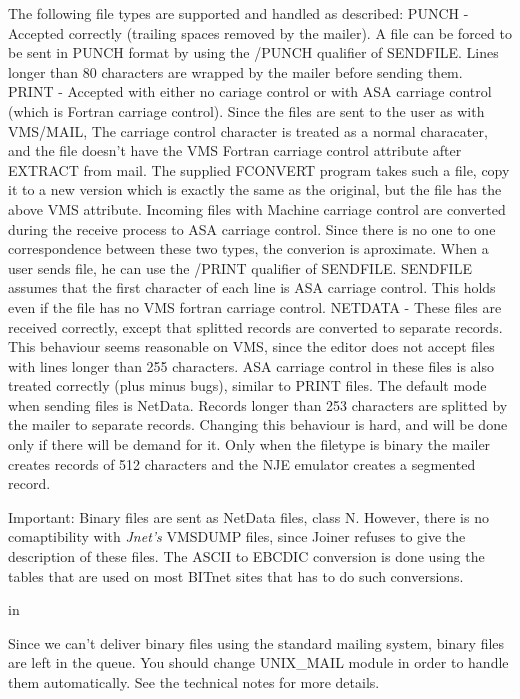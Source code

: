 The following file types are supported and handled as described:
\hfill\break
{\ncrBold PUNCH} -
Accepted  correctly (trailing spaces removed by the mailer). A
file can be forced to be sent  in  PUNCH  format  by  using  the  /PUNCH
qualifier  of  SENDFILE.  Lines longer than 80 characters are wrapped by
the mailer before sending them.
\hfill\break
{\ncrBold PRINT}
- Accepted with either no cariage control  or  with  ASA  carriage
control (which is Fortran carriage control). Since the files are sent to
the user as with VMS/MAIL, The carriage control character is treated  as
a  normal characater, and the file doesn't have the VMS Fortran carriage
control attribute after EXTRACT from mail. The supplied FCONVERT program
takes such a file, copy it to a new version which is exactly the same as
the original, but the file has the above VMS attribute.  Incoming  files
with  Machine  carriage control are converted during the receive process
to ASA carriage control. Since there is no  one  to  one  correspondence
between these two types, the converion is aproximate.
When  a user sends file, he can use the /PRINT qualifier of SENDFILE.
SENDFILE assumes that the first character of each line is  ASA  carriage
control.  This  holds  even  if  the  file  has  no VMS fortran carriage
control.
\hfill\break
{\ncrBold NETDATA}
- These files  are  received  correctly,  except  that  splitted
records   are  converted  to  separate  records.  This  behaviour  seems
reasonable on VMS, since the editor does not  accept  files  with  lines
longer  than 255 characters. ASA carriage control in these files is also
treated correctly (plus minus bugs), similar to PRINT files.
The default mode when sending files is NetData. Records  longer  than
253  characters are splitted by the mailer to separate records. Changing
this behaviour is hard, and will be done only if there  will  be  demand
for  it.  Only when the filetype is binary the mailer creates records of
512 characters and the NJE emulator creates a segmented record.

{\ncrBold Important:}
Binary files are sent as NetData  files,  class  N.  However,
there  is  no  comaptibility  with  {\sl Jnet's}  VMSDUMP  files, since Joiner
refuses to give the description of these files.
The ASCII to EBCDIC conversion is done using the tables that are used
on most BITnet sites that has to do such conversions.

 in

Since  we  can't  deliver  binary  files  using  the standard mailing
system, binary files are left in the queue. You should change  UNIX\_MAIL
module  in  order  to handle them automatically. See the technical notes
for more details.

